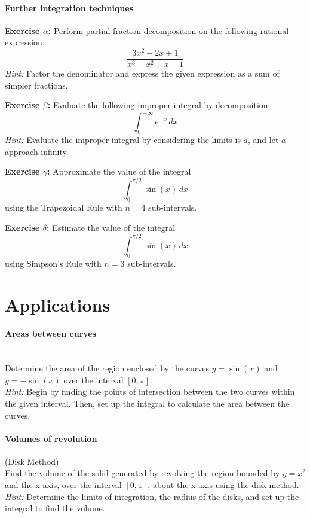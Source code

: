 \documentclass[]{article}
\begin{document}
	\paragraph{Further integration techniques}\mbox{}
	
	\textbf{Exercise $\alpha$:}
	Perform partial fraction decomposition on the following rational expression:
	\[
	\frac{3x^2 - 2x + 1}{x^3 - x^2 + x - 1}
	\]
	\textit{Hint:} Factor the denominator and express the given expression as a sum of simpler fractions.
	
	\textbf{Exercise $\beta$:}
	Evaluate the following improper integral by decomposition:
	\[
	\int_0^{+\infty} e^{-x}\, dx
	\]
	\textit{Hint:} Evaluate the improper integral by considering the limits is $a$, and let $a$ approach infinity.
	
	\textbf{Exercise $\gamma$:}
	Approximate the value of the integral
	\[
	\int_0^{\pi/2} \sin(x) \, dx
	\]
	using the Trapezoidal Rule with \(n = 4\) sub-intervals.
	
	\textbf{Exercise $\delta$:}
	Estimate the value of the integral
	\[
	\int_0^{\pi/2} \sin(x) \, dx
	\]
	using Simpson's Rule with \(n = 3\) sub-intervals.
	
	
	\section{Applications}
	\paragraph{Areas between curves}\mbox{}\\
	Determine the area of the region enclosed by the curves \(y = \sin(x)\) and \(y = -\sin(x)\) over the interval \([0, \pi]\).\\
	\textit{Hint:} Begin by finding the points of intersection between the two curves within the given interval.
	Then, set up the integral to calculate the area between the curves.
	
	\paragraph{Volumes of revolution} (Disk Method)\\
	Find the volume of the solid generated by revolving the region bounded by \(y = x^2\) and the x-axis, over the interval \([0, 1]\), about the x-axis using the disk method.\\
	\textit{Hint:} Determine the limits of integration, the radius of the disks, and set up the integral to find the volume.
	
\end{document}
